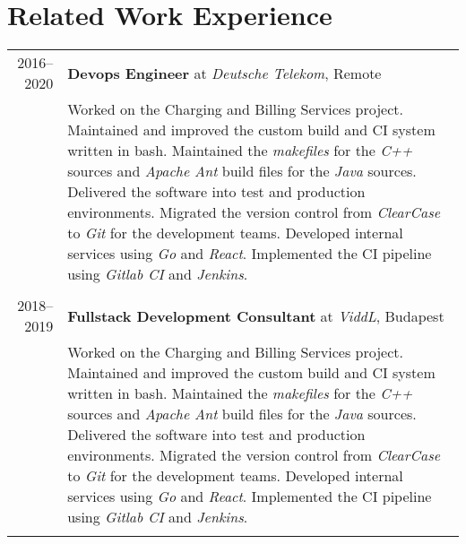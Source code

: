\documentclass[a4paper,10pt]{article} %
\begin{document}
\section{Related Work Experience}
\begin{tabular}{r|p{12.5cm}}
\textsc{2016--2020} & \textbf{Devops Engineer} at \emph{Deutsche Telekom}, Remote \\
& \footnotesize{Worked on the Charging and Billing Services project. Maintained and improved the custom build and CI system written in bash. Maintained the \emph{makefiles} for the \emph{C++} sources and \emph{Apache Ant} build files for the \emph{Java} sources. Delivered the software into test and production environments. Migrated the version control from \emph{ClearCase} to \emph{Git} for the development teams}. Developed internal services using \emph{Go} and \emph{React}. Implemented the CI pipeline using \emph{Gitlab CI} and \emph{Jenkins}.\\

\multicolumn{2}{c}{} \\
\textsc{2018--2019} & \textbf{Fullstack Development Consultant} at \emph{ViddL}, Budapest \\
& \footnotesize{Worked on the Charging and Billing Services project. Maintained and improved the custom build and CI system written in bash. Maintained the \emph{makefiles} for the \emph{C++} sources and \emph{Apache Ant} build files for the \emph{Java} sources. Delivered the software into test and production environments. Migrated the version control from \emph{ClearCase} to \emph{Git} for the development teams}. Developed internal services using \emph{Go} and \emph{React}. Implemented the CI pipeline using \emph{Gitlab CI} and \emph{Jenkins}.\\

\multicolumn{2}{c}{} \\


\end{tabular}
\end{document}
